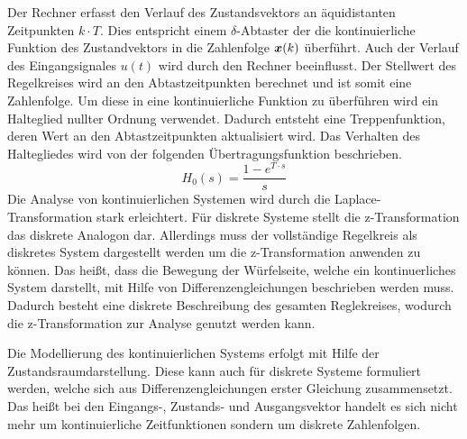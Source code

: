 Der Rechner erfasst den Verlauf des Zustandsvektors an äquidistanten Zeitpunkten $k\cdot T$. Dies entspricht einem $\delta$-Abtaster der die kontinuierliche Funktion des Zustandvektors in die Zahlenfolge $\boldsymbol{x}(k)$ überführt.
Auch der Verlauf des Eingangsignales $u(t)$ wird durch den Rechner beeinflusst. Der Stellwert des Regelkreises wird an den Abtastzeitpunkten berechnet und ist somit eine Zahlenfolge. Um diese in eine kontinuierliche Funktion zu überführen wird ein Halteglied nullter Ordnung verwendet. Dadurch entsteht eine Treppenfunktion, deren Wert an den Abtastzeitpunkten aktualisiert wird. Das Verhalten des Haltegliedes wird von der folgenden Übertragungsfunktion beschrieben.
\begin{equation}
H_0(s)=\frac{1-e^{T\cdot s}}{s}
\end{equation}
Die Analyse von kontinuierlichen Systemen wird durch die Laplace-Transformation stark erleichtert. Für diskrete Systeme stellt die z-Transformation das diskrete Analogon dar. Allerdings muss der vollständige Regelkreis als diskretes System dargestellt werden um die z-Transformation anwenden zu können. Das heißt, dass die Bewegung der Würfelseite, welche ein kontinuerliches System darstellt, mit Hilfe von Differenzengleichungen beschrieben werden muss. Dadurch besteht eine diskrete Beschreibung des gesamten Reglekreises, wodurch die z-Transformation zur Analyse genutzt werden kann.

Die Modellierung des kontinuierlichen Systems erfolgt mit Hilfe der Zustandsraumdarstellung. Diese kann auch für diskrete Systeme formuliert werden, welche sich aus Differenzengleichungen erster Gleichung zusammensetzt. Das heißt bei den Eingangs-, Zustands- und Ausgangsvektor handelt es sich nicht mehr um kontinuierliche Zeitfunktionen sondern um diskrete Zahlenfolgen.


